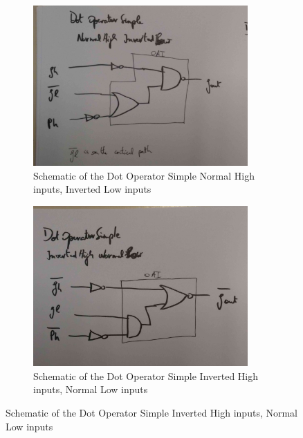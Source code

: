 \documentclass[english]{article}
\begin{document}
\begin{figure}[h!]
\centering
\begin{subfigure}{.5\textwidth}
  \centering
\includegraphics[width=0.9\textwidth]{figures/dosnhil}
\caption{Schematic of the Dot Operator Simple Normal High inputs, Inverted Low inputs}
\label{DONHIL}
\end{subfigure}%
\begin{subfigure}{.5\textwidth}
  \centering
\includegraphics[width=0.9\textwidth]{figures/dosihnl}
\caption{Schematic of the Dot Operator Simple Inverted High inputs, Normal Low inputs}
\label{DONHIL}
\end{subfigure}
\end{figure}
\end{document}
